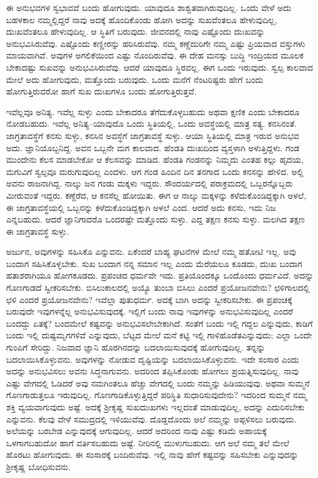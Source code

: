 ಈ ಅನುಭವಗಳ ಸ್ವಭಾವವೆ ಬಂದು ಹೋಗುವುದು. ಯಾವುದೂ ಶಾಶ್ವತವಾಗಿರುವುದಿಲ್ಲ. ಒಂದು ವೇಳೆ ಅದು ಬಹಳಕಾಲ ನಮ್ಮಲ್ಲಿದ್ದರೆ ನಾವು ಅದಕ್ಕೆ ಹೊಂದಿಕೊಂಡು ಹೋಗಿ ಅದನ್ನು ಸುಖವೆಂತಲೂ ಹೇಳುವುದಿಲ್ಲ, ದುಃಖವೆಂತಲೂ ಹೇಳುವುದಿಲ್ಲ. ಆ ಸ್ಥಿತಿಗೆ ಬರುವುದು. ಜೀವನದಲ್ಲಿ ನಾವು ಎಷ್ಟೊಂದು ದುಃಖವನ್ನು ಅನುಭವಿಸಿರುವೆವು. ಎಷ್ಟೊಂದು ಕಣ್ಣೀರನ್ನು ಹರಿಸಿರುವೆವು. ನಮ್ಮ ಕಣ್ಣೆದುರಿಗೇ ನಮ್ಮ ಎಷ್ಟು ಪ್ರಿಯವಾದ ವಸ್ತುಗಳು ಮಾಯವಾಗಿವೆ. ಅವುಗಳ ಅಗಲಿಕೆಯಿಂದ ಎಷ್ಟು ನೊಂದಿರುವೆವು. ಈ ದೇಹ ಮನಸ್ಸು ಬುದ್ಧಿ ಇಂದ್ರಿಯದ ಮೂಲಕ ಬೇಕಾದಷ್ಟು ಸುಖವನ್ನು ಅನುಭವಿಸಿರುವೆವು. ಆದರೆ ಯಾವುದೂ ಸ್ಥಿರವಲ್ಲ. ಈಗ ಒಂದು ಇರುವುದು. ಸ್ವಲ್ಪ ಕಾಲವಾದ ಮೇಲೆ ಅದು ಹೋಗುವುದು, ಮತ್ತೊಂದು ಬರುವುದು. ಒಂದು ಮನೆಗೆ ನೆಂಟರಿಷ್ಟರು ಹೇಗೆ ಬಂದು ಹೋಗುತ್ತಿರುವರೋ ಹಾಗೆ ಸುಖ ದುಃಖಗಳೂ ಬಂದು ಹೋಗುತ್ತಿರುತ್ತವೆ.

ಇವೆಲ್ಲವೂ ಅನಿತ್ಯ. ಇವೆಲ್ಲ ಸುಳ್ಳು ಎಂದು ಬೇಕಾದರೂ ತೆಗೆದುಕೊಳ್ಳಬಹುದು ಅಥವಾ ಕ್ಷಣಿಕ ಎಂದು ಬೇಕಾದರೂ ನೋಡಬಹುದು. ಇವೆಲ್ಲ ಅನಿತ್ಯ–ಯಾವುದೊ ಒಂದು ಸ್ಥಿತಿಯಲ್ಲಿ, ಒಂದು ಅವಸ್ಥೆಯಲ್ಲಿ ಮಾತ್ರ ಸತ್ಯ. ಕನಸಿನಂತೆ. ಜಾಗ್ರತಾವಸ್ಥೆಗೆ ಕನಸು ಸುಳ್ಳು, ಕನಸಿನ ಅವಸ್ಥೆಗೆ ಜಾಗ್ರತಾವಸ್ಥೆ ಸುಳ್ಳು. ಆಯಾ ಸ್ಥಿತಿಯಲ್ಲಿ ಮಾತ್ರ ಇರುವ ಅನುಭವ ಅದು. ಜ್ಞಾನಿಯೊಬ್ಬನಿದ್ದ. ಅವನ ಒಬ್ಬನೇ ಮಗ ಕಾಲವಾದ. ಹೆಂಡತಿ ದುಃಖದಿಂದ ವ್ಯಸ್ತಳಾಗಿ ಅಳುತ್ತಿದ್ದಳು. ಗಂಡ ಮುಂದೇನು ಕೆಲಸ ಮಾಡಬೇಕೋ ಆ ಕೆಲಸವನ್ನು ಮಾಡಿದ. ಹೆಂಡತಿ ಗಂಡನನ್ನು ನಿಮ್ಮದು ಎಂತಹ ಕಲ್ಲು ಹೃದಯ, ಮಗುವಿಗೆ ಸ್ವಲ್ಪವೂ ಮರುಗುವುದಿಲ್ಲ ಎಂದಳು. ಆಗ ಗಂಡ ಹಿಂದಿನ ದಿನ ತನಗಾದ ಒಂದು ಕನಸನ್ನು ಹೇಳಿದ. ಅಲ್ಲಿ ಅವನು ರಾಜನಾಗಿದ್ದ. ನಾಲ್ಕು ಜನ ಗಂಡು ಮಕ್ಕಳು ಇದ್ದರು. ಸೌಂದರ್ಯದಲ್ಲಿ ಪರಾಕ್ರಮದಲ್ಲಿ ಒಬ್ಬರನ್ನೊಬ್ಬರು ಮೀರುವಂತೆ ಇದ್ದರು. ಕಣ್ದೆರೆದ, ಆ ಕನಸೆಲ್ಲ ಹೋಯಿತು. ಈಗ ಆ ನಾಲ್ಕು ಮಕ್ಕಳನ್ನು ಕಳೆದುಕೊಂಡಿದ್ದಕ್ಕಾಗಿ ಅಳಲೆ, ಈ ಜಾಗ್ರತಾವಸ್ಥೆಯಲ್ಲಿ ಒಬ್ಬನನ್ನು ಕಳೆದುಕೊಂಡಿದ್ದಕ್ಕಾಗಿ ಅಳಲೆ ಎಂದ. ಆದರೆ ಅದು ಕನಸು, ಇದು ನಿಜ ಎನ್ನಬಹುದು. ಆದರೆ ಜ್ಞಾನಿಗಾದರೊ ಒಂದರಷ್ಟೇ ಮತ್ತೊಂದು ಸುಳ್ಳು. ಎದ್ದ ತಕ್ಷಣ ಕನಸು ಸುಳ್ಳು. ಮಲಗಿದ ತಕ್ಷಣ ಈ ಜಾಗ್ರತಾವಸ್ಥೆ ಸುಳ್ಳು.

ಅರ್ಜುನ, ಅವುಗಳನ್ನು ಸಹಿಸಿಕೊ ಎನ್ನುವನು. ಏಕೆಂದರೆ ಬಾಹ್ಯ ಘಟನೆಗಳ ಮೇಲೆ ನಮ್ಮ ಹತೋಟಿ ಇಲ್ಲ. ಅವು ಬಂದಾಗ ಸಹಿಸಿಕೊಳ್ಳಬೇಕು. ಸುಖ ಬಂದಾಗ ನನ್ನ ಸಮಾನ ಇಲ್ಲ ಎಂದು ಮೆರೆಯಲೂ ಕೂಡದು, ದುಃಖ ಬಂದಾಗ ಹತಾಶರಾಗಿಯೂ ಹೋಗಕೂಡದು. ಪ್ರಪಂಚದ ಧರ್ಮವೇ ಇದು. ಪ್ರತಿಯೊಂದಕ್ಕೂ ಒಂದೊಂದು ಧರ್ಮವಿದೆ. ಅದನ್ನು ಗೊಣಗಾಡದೆ ಸ್ವೀಕರಿಸಬೇಕು. ಬಿಸಿಲುಕಾಲದಲ್ಲಿ ಅಯ್ಯೊ ತುಂಬಾ ಬಿಸಿಲು ಎಂದರೆ ಪ್ರಯೋಜನವೇನು? ಛಳಿಗಾಲದಲ್ಲಿ ಛಳಿ ಎಂದರೆ ಪ್ರಯೋಜನವೇನು? ಇವೆಲ್ಲಾ ಪುತುಧರ್ಮ. ಅದಕ್ಕೆ ಬಾಗಿ ಅದನ್ನು ಸ್ವೀಕರಿಸಬೇಕು. ಈ ಪ್ರಪಂಚಕ್ಕೆ ಬರುವುದೇ ಇವುಗಳನ್ನೆಲ್ಲ ಅನುಭವಿಸುವುದಕ್ಕೆ. ಇಲ್ಲಿಗೆ ಬಂದು ನಾವು ಇವುಗಳನ್ನು ಅನುಭವಿಸುವುದಿಲ್ಲ ಎಂದರೆ ಬಂದದ್ದು ಏತಕ್ಕೆ? ಬಂದಮೇಲೆ ಕಷ್ಟವನ್ನು ಅನುಭವಿಸಲೇಬೇಕಾಗಿದೆ. ಸಂತೆಗೆ ಬಂದು ಇಲ್ಲಿ ಗದ್ದಲ ಎನ್ನುವುದು, ಕಾಡಿಗೆ ಬಂದು ಇಲ್ಲಿ ದುಷ್ಟಮೃಗಗಳಿವೆ ಎನ್ನುವುದು, ಬೆಟ್ಟದ ಮೇಲೆ ಮನೆ ಕಟ್ಟಿ ಇಲ್ಲಿ ಗಾಳಿಹೊಡೆತ\break ಎನ್ನುವುದು; ಎಲ್ಲಾ ಒಂದೇ ಗುಂಪಿಗೆ ಸೇರಿದ್ದು. ನಿಜವಾದ ಜ್ಞಾನಿ ಹೊರಗಿನದನ್ನು ಬದಲಾಯಿ\-ಸುವುದಕ್ಕೆ ಹೋಗುವುದಿಲ್ಲ. ತನ್ನನ್ನು ಬದಲಾಯಿಸಿಕೊಳ್ಳುವನು. ಅವುಗಳನ್ನು ನೋಡುವ ದೃಷ್ಟಿಯನ್ನು ಬದಲಾಯಿಸಿಕೊಳ್ಳುವನು. ಇದೇ ಸಂಸಾರ ಎಂದು ಅದನ್ನು ಅನುಭವಿಸಲು ಅವನು ಸಿದ್ಧನಾಗುವನು. ಅದರಿಂದ ತಪ್ಪಿಸಿಕೊಂಡು ಹೋಗಲು ಪ್ರಯತ್ನಿಸುವುದಿಲ್ಲ. ನಾವು ಎಷ್ಟು ವೇಗದಲ್ಲಿ ಓಡಿದರೆ ಅವು ನಮಗಿಂತಲೂ ಹೆಚ್ಚು ವೇಗದಲ್ಲಿ ಬಂದು ನಮ್ಮನ್ನು ಹಿಡಿಯುವುವು. ಅಥವಾ ಸುಮ್ಮನೆ ಗೊಣಗಾಡುತ್ತಲೂ ಇರುವುದಿಲ್ಲ. ಗೊಣಗಾಡಿಕೊಳ್ಳುತ್ತಿದ್ದರೆ ಪರಿಸ್ಥಿತಿ ಸುಧಾರಿಸುವು\-ದೇನು? ಇದರಿಂದ ಸುಮ್ಮನೆ ನಮ್ಮ ಶಕ್ತಿ ವ್ಯಯವಾಗುವುದು ಅಷ್ಟೆ. ಅದಕ್ಕೆ ಶ‍್ರೀಕೃಷ್ಣ ಸುಖದುಃಖಗಳು ಇಲ್ಲದಂತೆ ಮಾಡುವುದಿಲ್ಲ, ಅದನ್ನು ಎದುರಿಸಬೇಕು ಎನ್ನುವನು. ಕೆಲವು ವೇಳೆ ಸಮುದ್ರದಲ್ಲಿ ಇಳಿಯುವೆವು. ದೊಡ್ಡದೊಂದು ಅಲೆ ನಮ್ಮನ್ನು ಅಪ್ಪಳಿಸಲು ಬರುವುದು. ಅಲೆಯನ್ನು ಬರಬೇಡ ಎನ್ನುವುದಕ್ಕೆ ಆಗುವುದಿಲ್ಲ. ಆದರೆ ಅದರಿಂದ ನಾವು ಎಷ್ಟು ಕಡಿಮೆ ಅಪಾಯಕ್ಕೆ ಒಳಗಾಗಬಹುದೋ ಹಾಗೆ ವರ್ತಿಸಬಹುದು ಅಷ್ಟೆ. ನೀರಿನಲ್ಲಿ ಮುಳುಗಬಹುದು. ಆಗ ಅಲೆ ನಮ್ಮ ತಲೆ ಮೇಲೆ ಹೊರಟು ಹೋಗುವುದು. ಈ ಸಂಸಾರಕ್ಕೆ ಬಂದಿರುವೆವು. ಇಲ್ಲಿ ನಾವು ಹೇಗೆ ಕಷ್ಟವನ್ನು ಸಹಿಸಬೇಕು ಎನ್ನುವುದನ್ನು ಶ‍್ರೀಕೃಷ್ಣ ಬೋಧಿಸುವನು.

